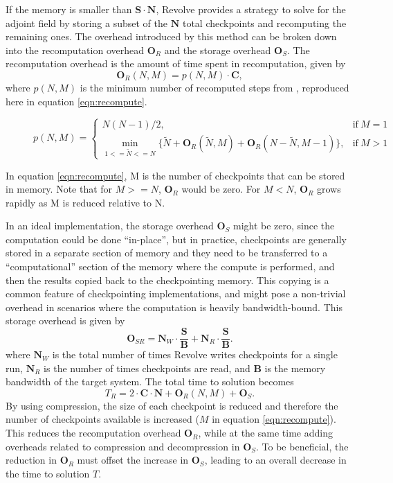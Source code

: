 \documentclass[conference]{IEEEtran}
\begin{document}
If the memory is smaller than $\mathbf{S} \cdot \mathbf{N}$, Revolve provides
a strategy to solve for the adjoint field by storing a subset of the $\mathbf{N}$ total checkpoints
and recomputing the remaining ones. The overhead introduced by this method can be broken down into
the recomputation overhead $\mathbf{O}_R$ and the storage overhead $\mathbf{O}_S$. The recomputation
overhead is the amount of time spent in recomputation, given by
\begin{equation}
\mathbf{O}_R(N, M) = p(N, M) \cdot \mathbf{C},
\end{equation}
where $p(N, M)$ is the minimum number of recomputed steps from \cite{griewank2000algorithm}, reproduced
here in equation \ref{eqn:recompute}.
\begin{figure}
\begin{equation}
p(N, M) = \begin{cases}
      N(N-1) /2, & \text{if}\ M=1 \\
      \min\limits_{1<=\widetilde{N}<=N} \{\widetilde{N} + \mathbf{O}_R(\widetilde{N}, M) + \mathbf{O}_R(N-\widetilde{N}, M-1)\}, & \text{if}\ M>1
    \end{cases}
    \label{eqn:recompute}
\end{equation}
\end{figure}
In equation \ref{eqn:recompute}, M is the number of checkpoints that can be
stored in memory. Note that for $M >=N$, $\mathbf{O}_R$ would be zero. For $M <
N$, $\mathbf{O}_R$ grows rapidly as M is reduced relative to N. 

In an ideal implementation, the storage overhead $\mathbf{O}_S$ might be zero, since the computation could
be done ``in-place'', but in practice, checkpoints are generally stored in a separate section of memory and they
need to be transferred to a ``computational'' section of the memory where the compute is performed, and then
the results copied back to the checkpointing memory. This copying is a common feature of checkpointing
implementations, and might pose a non-trivial overhead in scenarios where the computation is heavily bandwidth-bound. 
This storage overhead is given by
\begin{equation}
\mathbf{O}_{SR} = \mathbf{N}_W \cdot \frac{\mathbf{S}}{\mathbf{B}} +
\mathbf{N}_R \cdot \frac{\mathbf{S}}{\mathbf{B}}.
\label{eqn:storage}
\end{equation}
where $\mathbf{N}_W$ is the total number of times Revolve writes
checkpoints for a single run, $ \mathbf{N}_R$ is the number of times
checkpoints are read, and $\mathbf{B}$ is the memory bandwidth of the
target system. The total time to solution becomes
\begin{equation}
T_R = 2 \cdot \mathbf{C} \cdot \mathbf{N} + \mathbf{O}_R(N, M) + \mathbf{O}_S.
\end{equation} 
By using compression, the size of each checkpoint is reduced and therefore the
number of checkpoints available is increased ($M$ in equation
\ref{eqn:recompute}). This reduces the recomputation overhead $\mathbf{O}_R$,
while at the same time adding overheads related to compression and decompression
in $\mathbf{O}_S$.
To be beneficial, the reduction in $\mathbf{O}_R$ must offset the increase in 
$\mathbf{O}_S$, leading to an overall decrease in the time to solution $T$.
\end{document}
